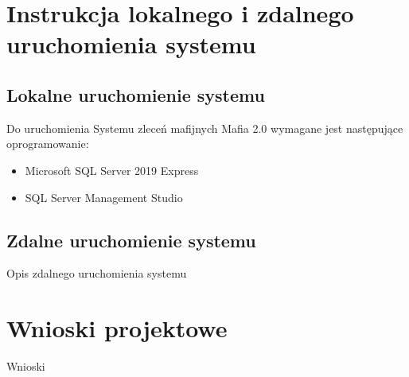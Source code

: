 \documentclass[12pt,a4paper]{article}
\begin{document}
	\section{Instrukcja lokalnego i zdalnego uruchomienia systemu}
		\subsection{Lokalne uruchomienie systemu}
			Do uruchomienia Systemu zleceń mafijnych Mafia 2.0 wymagane jest następujące oprogramowanie:
			\begin{itemize}
				\item Microsoft SQL Server 2019 Express
				\item SQL Server Management Studio
			\end{itemize}
		\subsection{Zdalne uruchomienie systemu}
			Opis zdalnego uruchomienia systemu
	
	\section{Wnioski projektowe}
		Wnioski
\end{document}
